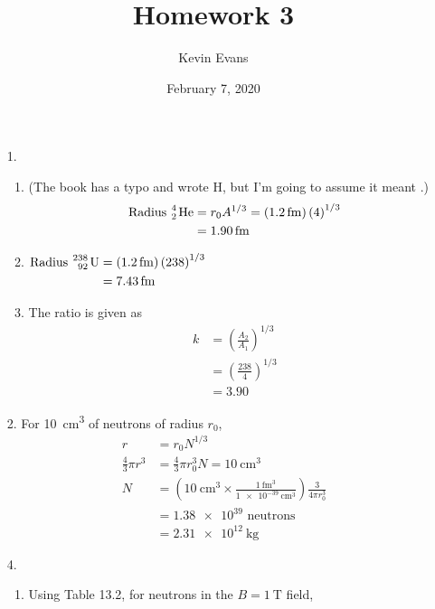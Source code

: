 \documentclass{homework}
\title{Homework 3}
\author{Kevin Evans}
\date{February 7, 2020}
\begin{document}
	\maketitle
	
	\begin{enumerate}
		\item[1.] \begin{enumerate}
			\item (The book has a typo and wrote H, but I'm going to assume it meant .)
				\begin{align*}
				\text{Radius } \ce{^4_2 He} & = r_0 A^{1/3} = \left( \SI{1.2}{\femto\meter} \right) \left(4\right)^{1/3} \\
					& = \SI{1.90}{\femto\meter}
				\end{align*}
			\item \hfil $\begin{aligned}[t]
			\text{Radius } \ce{^{238}_{92} U} & = \left(\SI{1.2}{\femto\meter}\right) \left(238\right)^{1/3} \hspace{3.5em} \\
				& = \SI{7.43}{\femto\meter}
			\end{aligned}$
			\item The ratio is given as \begin{align*}
				k & = \left( \frac{A_2}{A_1} \right)^{1/3} \\
					& = \left( \frac{238}{4} \right)^{1/3} \\
					& = 3.90
			\end{align*}
		\end{enumerate}
		\item[2.] For \SI{10}{\centi\meter\cubed} of neutrons of radius $r_0$, \begin{align*}
			r & = r_0  N^{1/3} \\
			\frac{4}{3}\pi r^3 & = \frac{4}{3} \pi r_0^3 N = \SI{10}{\centi\meter\cubed} \\
			N & = \left(
					\SI{10}{\centi\meter\cubed}
					\times
					\frac{\SI{1}{\femto\meter\cubed}}{\SI{1e-39}{\centi\meter\cubed}}
				\right)
				\frac{3}{4 \pi r_0^3} \\
				& = \num{1.38e39} \text{ neutrons} \\
				& = \SI{2.31e12}{\kg}
		\end{align*}
		\item[4.] \begin{enumerate}
			\item Using Table 13.2, for neutrons in the $B=\SI{1}{\tesla}$ field, 

\end{enumerate}
\end{enumerate}
\end{document}
